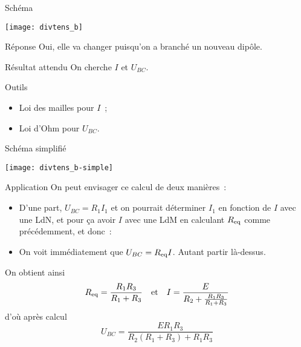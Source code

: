 \documentclass[a4paper, 12pt, final, garamond]{book}
\begin{document}
\begin{tcbraster}[raster columns=3, raster equal height=rows]
    \begin{NCdefi}{Schéma}
        \begin{center}
            \texttt{[image: divtens\_b]}
        \end{center}
    \end{NCdefi}
    \begin{tcolorbox}[blankest, raster multicolumn=1, space to=\myspace]
        \begin{tcbraster}[raster columns=1]
            \begin{NCexem}{Réponse}
                Oui, elle va changer puisqu'on a branché un nouveau dipôle.
            \end{NCexem}
            \begin{NCprop}{Résultat attendu}
                On cherche $I$ et $U_{BC}$.
            \end{NCprop}
            \begin{NCrapp}[add to natural height=\myspace]{Outils}
                \begin{itemize}[leftmargin=10pt]
                    \item Loi des mailles pour $I$~;
                    \item Loi d'Ohm pour $U_{BC}$.
                \end{itemize}
            \end{NCrapp}
        \end{tcbraster}
    \end{tcolorbox}
    \begin{NCinte}{Schéma simplifié}
        \begin{center}
            \texttt{[image: divtens\_b-simple]}
        \end{center}
    \end{NCinte}
\end{tcbraster}
\begin{center}
    \begin{NCexem}[sidebyside]{Application}
        On peut envisager ce calcul de deux manières~:
        \begin{itemize}

            \item D'une part, $U_{BC} = R_1 I_1$ et on pourrait déterminer $I_1$
                en fonction de $I$ avec une LdN, et pour ça avoir $I$ avec une
                LdM en calculant $R_{\rm eq}$ comme précédemment, et donc~:

            \item On voit immédiatement que $U_{BC} = R_{\rm eq}I$. Autant
                partir là-dessus.
        \end{itemize}
        \tcblower
        On obtient ainsi \[ R_{\rm eq} = \frac{R_1R_3}{R_1+R_3} \quad \text{et}
        \quad I = \frac{E}{R_2 + \frac{R_1R_3}{R_1+R_3}}\] d'où après calcul
        \[\boxed{U_{BC} = \frac{ER_1R_3}{R_2(R_1+R_3)+R_1R_3}}\]
    \end{NCexem}
\end{center}
\end{document}
